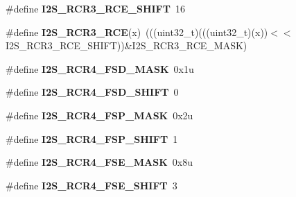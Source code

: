 \begin{DoxyCompactItemize}
\item 
\#define {\bfseries I2\+S\+\_\+\+R\+C\+R3\+\_\+\+R\+C\+E\+\_\+\+S\+H\+I\+FT}~16\hypertarget{group__I2S__Register__Masks_ga1ed5dcaaac88cd06cfc10bb290c7f097}{}\label{group__I2S__Register__Masks_ga1ed5dcaaac88cd06cfc10bb290c7f097}

\item 
\#define {\bfseries I2\+S\+\_\+\+R\+C\+R3\+\_\+\+R\+CE}(x)~(((uint32\+\_\+t)(((uint32\+\_\+t)(x))$<$$<$I2\+S\+\_\+\+R\+C\+R3\+\_\+\+R\+C\+E\+\_\+\+S\+H\+I\+FT))\&I2\+S\+\_\+\+R\+C\+R3\+\_\+\+R\+C\+E\+\_\+\+M\+A\+SK)\hypertarget{group__I2S__Register__Masks_ga7bdf74b0c7537c65dfdb73ef6f966e92}{}\label{group__I2S__Register__Masks_ga7bdf74b0c7537c65dfdb73ef6f966e92}

\item 
\#define {\bfseries I2\+S\+\_\+\+R\+C\+R4\+\_\+\+F\+S\+D\+\_\+\+M\+A\+SK}~0x1u\hypertarget{group__I2S__Register__Masks_ga73d35aef97f3e91b82beb86b19b0b04f}{}\label{group__I2S__Register__Masks_ga73d35aef97f3e91b82beb86b19b0b04f}

\item 
\#define {\bfseries I2\+S\+\_\+\+R\+C\+R4\+\_\+\+F\+S\+D\+\_\+\+S\+H\+I\+FT}~0\hypertarget{group__I2S__Register__Masks_gab4d17b5f07f9c4c8ba9e25ff5352d47c}{}\label{group__I2S__Register__Masks_gab4d17b5f07f9c4c8ba9e25ff5352d47c}

\item 
\#define {\bfseries I2\+S\+\_\+\+R\+C\+R4\+\_\+\+F\+S\+P\+\_\+\+M\+A\+SK}~0x2u\hypertarget{group__I2S__Register__Masks_gadebeb77b006bfdfa2a247a1004b3ed26}{}\label{group__I2S__Register__Masks_gadebeb77b006bfdfa2a247a1004b3ed26}

\item 
\#define {\bfseries I2\+S\+\_\+\+R\+C\+R4\+\_\+\+F\+S\+P\+\_\+\+S\+H\+I\+FT}~1\hypertarget{group__I2S__Register__Masks_gac009d35af5a1ed6a1201d23dbcfcea72}{}\label{group__I2S__Register__Masks_gac009d35af5a1ed6a1201d23dbcfcea72}

\item 
\#define {\bfseries I2\+S\+\_\+\+R\+C\+R4\+\_\+\+F\+S\+E\+\_\+\+M\+A\+SK}~0x8u\hypertarget{group__I2S__Register__Masks_ga9c6885d55f2de2dcd4649b15582dbd63}{}\label{group__I2S__Register__Masks_ga9c6885d55f2de2dcd4649b15582dbd63}

\item 
\#define {\bfseries I2\+S\+\_\+\+R\+C\+R4\+\_\+\+F\+S\+E\+\_\+\+S\+H\+I\+FT}~3\hypertarget{group__I2S__Register__Masks_ga37d794e272f05da947af5073c3340a6e}{}\label{group__I2S__Register__Masks_ga37d794e272f05da947af5073c3340a6e}


\end{DoxyCompactItemize}
